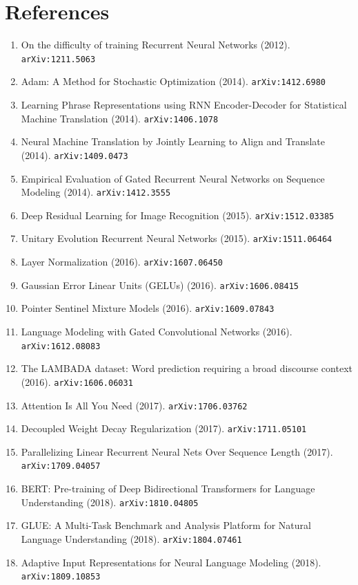 \documentclass[11pt]{article}
\begin{document}
\section*{References}
\begin{enumerate}\small
  \item On the difficulty of training Recurrent Neural Networks (2012). \texttt{arXiv:1211.5063}
  \item Adam: A Method for Stochastic Optimization (2014). \texttt{arXiv:1412.6980}
  \item Learning Phrase Representations using RNN Encoder-Decoder for
  Statistical Machine Translation (2014). \texttt{arXiv:1406.1078}
  \item Neural Machine Translation by Jointly Learning to Align and Translate (2014). \texttt{arXiv:1409.0473}
  \item Empirical Evaluation of Gated Recurrent Neural Networks on Sequence
  Modeling (2014). \texttt{arXiv:1412.3555}
  \item Deep Residual Learning for Image Recognition (2015). \texttt{arXiv:1512.03385}
  \item Unitary Evolution Recurrent Neural Networks (2015). \texttt{arXiv:1511.06464}
  \item Layer Normalization (2016). \texttt{arXiv:1607.06450}
  \item Gaussian Error Linear Units (GELUs) (2016). \texttt{arXiv:1606.08415}
  \item Pointer Sentinel Mixture Models (2016). \texttt{arXiv:1609.07843}
  \item Language Modeling with Gated Convolutional Networks (2016). \texttt{arXiv:1612.08083}
  \item The LAMBADA dataset: Word prediction requiring a broad discourse context (2016). \texttt{arXiv:1606.06031}
  \item Attention Is All You Need (2017). \texttt{arXiv:1706.03762}
  \item Decoupled Weight Decay Regularization (2017). \texttt{arXiv:1711.05101}
  \item Parallelizing Linear Recurrent Neural Nets Over Sequence Length (2017). \texttt{arXiv:1709.04057}
  \item BERT: Pre-training of Deep Bidirectional Transformers for Language
  Understanding (2018). \texttt{arXiv:1810.04805}
  \item GLUE: A Multi-Task Benchmark and Analysis Platform for Natural Language
  Understanding (2018). \texttt{arXiv:1804.07461}
  \item Adaptive Input Representations for Neural Language Modeling (2018). \texttt{arXiv:1809.10853}

\end{enumerate}
\end{document}
